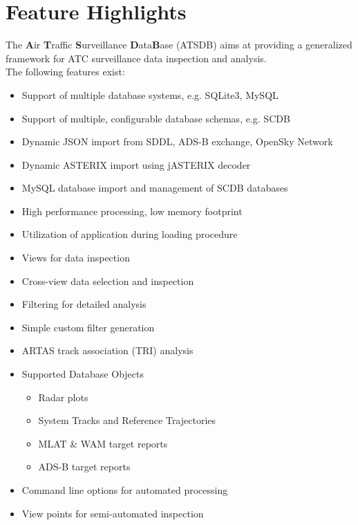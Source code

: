 \section{Feature Highlights}

The \textbf{A}ir \textbf{T}raffic \textbf{S}urveillance \textbf{D}ata\textbf{B}ase (ATSDB) aims at providing a generalized framework for ATC surveillance data inspection and analysis. \\

The following features exist: \\

\begin{itemize}  
\item Support of multiple database systems, e.g. SQLite3, MySQL
\item Support of multiple, configurable database schemas, e.g. SCDB
\item Dynamic JSON import from SDDL, ADS-B exchange, OpenSky Network
\item Dynamic ASTERIX import using jASTERIX decoder
\item MySQL database import and management of SCDB databases
\item High performance processing, low memory footprint
\item Utilization of application during loading procedure
\item Views for data inspection
\item Cross-view data selection and inspection
\item Filtering for detailed analysis
\item Simple custom filter generation
\item ARTAS track association (TRI) analysis
\item Supported Database Objects
\begin{itemize}  
\item Radar plots
\item System Tracks and Reference Trajectories
\item MLAT \& WAM target reports
\item ADS-B target reports
\end{itemize}
\item Command line options for automated processing
\item View points for semi-automated inspection
\end{itemize} 

